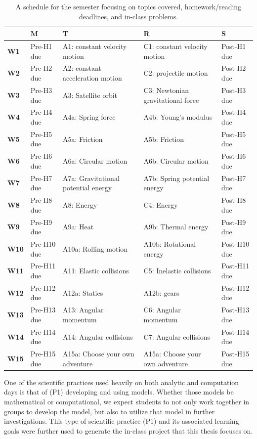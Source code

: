 \documentclass{msuphddissertation}
\begin{document}
\begin{doublespace}
\begin{table}[t]\scriptsize\center
\begin{tabular}{|l|l|l|l|l|}\hline
   & \textbf M & \textbf T & \textbf R & \textbf S \\\hline
\textbf{W1} & Pre-H1 due & A1: constant velocity motion & C1: constant velocity motion & Post-H1 due \\\hline
\textbf{W2} & Pre-H2 due & A2: constant acceleration motion & C2: projectile motion & Post-H2 due \\\hline
\textbf{W3} & Pre-H3 due & A3: Satellite orbit & C3: Newtonian gravitational force & Post-H3 due \\\hline
\textbf{W4} & Pre-H4 due & A4a: Spring force & A4b: Young's modulus & Post-H4 due \\\hline
\textbf{W5} & Pre-H5 due & A5a: Friction & A5b: Friction & Post-H5 due \\\hline
\textbf{W6} & Pre-H6 due & A6a: Circular motion & A6b: Circular motion & Post-H6 due \\\hline
\textbf{W7} & Pre-H7 due & A7a: Gravitational potential energy & A7b: Spring potential energy & Post-H7 due \\\hline
\textbf{W8} & Pre-H8 due & A8: Energy & C4: Energy & Post-H8 due \\\hline
\textbf{W9} & Pre-H9 due & A9a: Heat & A9b: Thermal energy & Post-H9 due \\\hline
\textbf{W10} & Pre-H10 due & A10a: Rolling motion & A10b: Rotational energy & Post-H10 due \\\hline
\textbf{W11} & Pre-H11 due & A11: Elastic collisions & C5: Inelastic collisions & Post-H11 due \\\hline
\textbf{W12} & Pre-H12 due & A12a: Statics & A12b: gears & Post-H12 due \\\hline
\textbf{W13} & Pre-H13 due & A13: Angular momentum & C6: Angular momentum & Post-H13 due \\\hline
\textbf{W14} & Pre-H14 due & A14: Angular collisions & C7: Angular collisions & Post-H14 due \\\hline
\textbf{W15} & Pre-H15 due & A15a: Choose your own adventure & A15a: Choose your own adventure & Post-H15 due \\\hline
\end{tabular}\caption{A schedule for the semester focusing on topics covered, homework/reading deadlines, and in-class problems.}\label{CH3:Schedule}
\end{table}

One of the scientific practices used heavily on both analytic and computation days is that of (P1) developing and using models.  Whether those models be mathematical or computational, we expect students to not only work together in groups to develop the model, but also to utilize that model in further investigations.  This type of scientific practice (P1) and its associated learning goals \cite{Irving2017} were further used to generate the in-class project that this thesis focuses on.


\end{doublespace}
\end{document}
